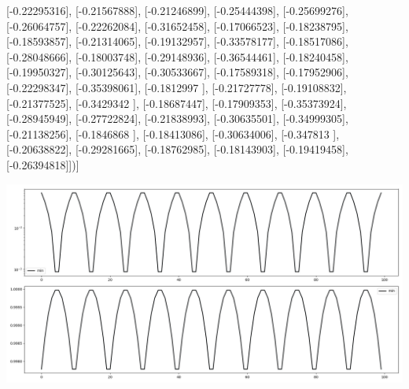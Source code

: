 \documentclass{article}
\begin{document}
       [-0.22295316],
       [-0.21567888],
       [-0.21246899],
       [-0.25444398],
       [-0.25699276],
       [-0.26064757],
       [-0.22262084],
       [-0.31652458],
       [-0.17066523],
       [-0.18238795],
       [-0.18593857],
       [-0.21314065],
       [-0.19132957],
       [-0.33578177],
       [-0.18517086],
       [-0.28048666],
       [-0.18003748],
       [-0.29148936],
       [-0.36544461],
       [-0.18240458],
       [-0.19950327],
       [-0.30125643],
       [-0.30533667],
       [-0.17589318],
       [-0.17952906],
       [-0.22298347],
       [-0.35398061],
       [-0.1812997 ],
       [-0.21727778],
       [-0.19108832],
       [-0.21377525],
       [-0.3429342 ],
       [-0.18687447],
       [-0.17909353],
       [-0.35373924],
       [-0.28945949],
       [-0.27722824],
       [-0.21838993],
       [-0.30635501],
       [-0.34999305],
       [-0.21138256],
       [-0.1846868 ],
       [-0.18413086],
       [-0.30634006],
       [-0.347813  ],
       [-0.20638822],
       [-0.29281665],
       [-0.18762985],
       [-0.18143903],
       [-0.19419458],
       [-0.26394818]])]
\begin{center}
\includegraphics[scale=.9]{control_dpn_all.png}

\end{center}
\end{document}
